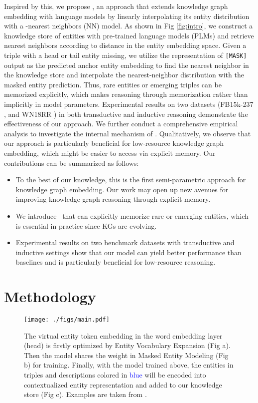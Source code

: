 \documentclass[runningheads]{llncs}
\begin{document}
Inspired by this, we propose \ours, an approach that extends knowledge graph embedding with language models by linearly interpolating its entity distribution with a -nearest neighbors (NN) model. 
As shown in Fig \ref{fig:intro}, we construct a knowledge store of entities with pre-trained language models (PLMs) and retrieve nearest neighbors according to distance in the entity embedding space. 
Given a triple with a head or tail entity missing, we utilize the representation of \texttt{[MASK]} output as the predicted anchor entity embedding to find the nearest neighbor in the knowledge store and interpolate the nearest-neighbor distribution with the masked entity prediction. 
Thus, rare entities or emerging triples can be memorized explicitly, which makes reasoning through memorization rather than implicitly in model parameters.
Experimental results on two datasets (FB15k-237 \cite{fb15k}, and WN18RR \cite{wn18rr}) in both transductive and inductive reasoning demonstrate the effectiveness of our approach. 
We further conduct a comprehensive empirical analysis to investigate the internal mechanism of {\ours}.
Qualitatively, we observe that our approach is particularly beneficial for low-resource knowledge graph embedding, which might be easier to access via explicit memory.
 Our contributions can be summarized as follows:
\begin{itemize}
    \item To the best of our knowledge, this is the first semi-parametric approach for knowledge graph embedding. 
    Our work may open up new avenues for improving knowledge graph reasoning through explicit memory.
    
    \item We introduce \ours~that can explicitly memorize rare or emerging entities, which is essential in practice since KGs are evolving. 
    
    \item Experimental results on two benchmark datasets with transductive and inductive settings show that our model can yield better performance than baselines and is particularly beneficial for low-resource reasoning.
\end{itemize}



\section{Methodology} 


\begin{figure*}[!htbp]
\centering 
\texttt{[image: ./figs/main.pdf]} 
\caption{
The virtual entity token embedding  in the word embedding layer (head) is firstly optimized by Entity Vocabulary Expansion (Fig a).
Then the model  shares the weight  in Masked Entity Modeling (Fig b) for training.
Finally, with the model trained above, the entities in triples and descriptions colored in \textcolor{blue}{blue} will be encoded into contextualized entity representation and added to our knowledge store (Fig c).
Examples are taken from \protect\cite{liu2021indigo}.
}
\label{fig:model}
\end{figure*}
\end{document}
